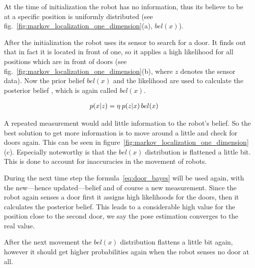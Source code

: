 \documentclass[Thesis.tex]{subfiles}
\begin{document}
At the time of initialization the robot has no information, thus its believe to be at a specific position is uniformly distributed (see fig.~\ref{fig:markov_localization_one_dimension}(a), $bel(x)$).

After the initialization the robot uses its sensor to search for a door. It finds out that in fact it is located in front of one, so it applies a high likelihood for all positions which are in front of doors (see fig.~\ref{fig:markov_localization_one_dimension}(b),  where $z$ denotes the sensor data). Now the prior belief $bel(x)$ and the likelihood  are used to calculate the posterior belief , which is again called $bel(x)$.

\begin{align}
p\!\left({x}\middle|{z}\right) &= \eta\: p\!\left({z}\middle|{x}\right) bel(x) \label{eq:door_bayes}
\end{align}

A repeated measurement would add little information to the robot's belief. So the best solution to get more information is to move around a little and check for doors again. This can be seen in figure~\ref{fig:markov_localization_one_dimension}(c). Especially noteworthy is that the $bel(x)$ distribution is flattened a little bit. This is done to account for inaccuracies in the movement of robots.

During the next time step the formula~\ref{eq:door_bayes} will be used again, with the new---hence updated---belief and of course a new measurement. Since the robot again senses a door first it assigns high likelihoods for the doors, then it calculates the posterior belief. This leads to a considerable high value for the position close to the second door, we say the pose estimation converges to the real value. 

After the next movement the $bel(x)$ distribution flattens a little bit again, however it should get higher probabilities again when the robot senses no door at all.

\end{document}
